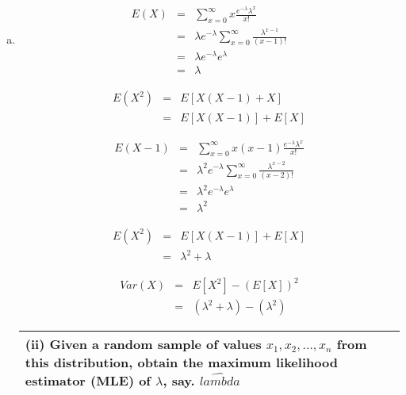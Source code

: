 \documentclass[a4paper,12pt]{article}
\begin{document}
\begin{enumerate}[(a)]
\item 

\begin{multicols}{2}
\begin{eqnarray*}
E(X) &=&  \sum^{\infty}_{x=0} x \frac{e^{-\lambda}\lambda^{x}}{x!}  \\
&=&  \lambda e^{-\lambda}\sum^{\infty}_{x=0} \frac{\lambda^{x-1}}{(x-1)!}  \\
&=& \lambda e^{-\lambda} e^{\lambda}\\
&=& \lambda
\end{eqnarray*}

\begin{eqnarray*} E(X^2) &=& E[X(X-1) + X] \\ &=& E[X(X-1)] + E[X] 
\end{eqnarray*}
\end{multicols}

\begin{multicols}{2}
\begin{eqnarray*}
E(X-1) &=&  \sum^{\infty}_{x=0} x(x-1)\frac{e^{-\lambda}\lambda^{x}}{x!}  \\
&=&  \lambda^2 e^{-\lambda}\sum^{\infty}_{x=0} \frac{\lambda^{x-2}}{(x-2)!}  \\
&=& \lambda^2 e^{-\lambda} e^{\lambda}\\
&=& \lambda^2
\end{eqnarray*}

\begin{eqnarray*} E(X^2) &=& E[X(X-1)] + E[X] \\ &=& \lambda^2 + \lambda \end{eqnarray*}

\begin{eqnarray*}Var(X) &=& E[X^2] - (E[X])^2 \\ &=& (\lambda^2 + \lambda)- (\lambda^2) \end{eqnarray*}
\end{multicols}

\newpage
\begin{table}[ht!]
\centering

\begin{tabular}{|p{15cm}|}
\hline        

\noindent

(ii) Given a random sample of values $x_1, x_2, \ldots, x_n$ from this distribution, obtain the maximum likelihood estimator (MLE) of $\lambda$, say. $\hat{lambda}$
\\ \hline
      

\end{tabular}
\end{table}
\end{enumerate}
\end{document}
